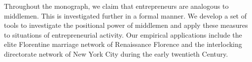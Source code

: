 \documentclass[11pt,fleqn]{book}
\begin{document}
\begin{singlespace}
Throughout the monograph, we claim that entrepreneurs are analogous to middlemen. This is investigated further in a formal manner. We develop a set of tools to investigate the positional power of middlemen and apply these measures to situations of entrepreneurial activity. Our empirical applications include the elite Florentine marriage network of Renaissance Florence and the interlocking directorate network of New York City during the early twentieth Century.

\end{singlespace}

\newpage
\mbox{}
\thispagestyle{empty}
\newpage













\singlespace




\end{document}
